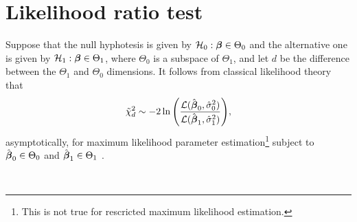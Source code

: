 \documentclass[twocolumn,draft]{article}
\begin{document}
\section{Likelihood ratio test}

Suppose that the null hyphotesis is given by
$\mathcal{H}_0: \boldsymbol{\beta} \in \Theta_0$ and the alternative one is given by
$\mathcal{H}_1: \boldsymbol{\beta} \in \Theta_1$, where $\Theta_0$ is a subspace of $\Theta_1$,
and let $d$ be the difference between the $\Theta_1$ and $\Theta_0 $
dimensions.
It follows from classical likelihood theory that
\begin{equation*}
	\tilde{\chi}^2_d \sim -2\ln
	\Bigg(
		\frac{\mathcal{L}(\hat{\boldsymbol{\beta}}_0, \hat\sigma_0^2)}
		     {\mathcal{L}(\hat{\boldsymbol{\beta}}_1, \hat\sigma_1^2)}
	\Bigg),
\end{equation*}
asymptotically, for maximum likelihood parameter estimation\footnote{This is
not true for rescricted maximum likelihood estimation.}
subject to $\hat{\boldsymbol{\beta}}_0 \in \Theta_0$ and $\hat{\boldsymbol{\beta}}_1 \in \Theta_1$
\cite{verbeke2009linear}.

\printbibliography\
\end{document}

